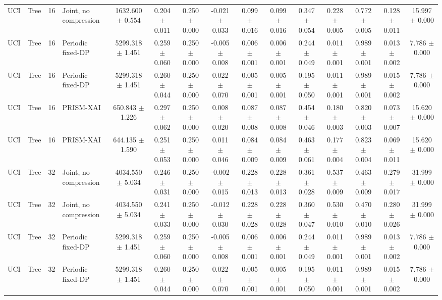 \begin{table}[t]
\begin{tabular}{llllccccccccccc}
UCI & Tree & 16 & Joint, no compression & 1632.600 $\pm$ 0.554 & 0.204 $\pm$ 0.011 & 0.250 $\pm$ 0.000 & -0.021 $\pm$ 0.033 & 0.099 $\pm$ 0.016 & 0.099 $\pm$ 0.016 & 0.347 $\pm$ 0.054 & 0.228 $\pm$ 0.005 & 0.772 $\pm$ 0.005 & 0.128 $\pm$ 0.011 & 15.997 $\pm$ 0.000 \\
UCI & Tree & 16 & Periodic fixed-DP & 5299.318 $\pm$ 1.451 & 0.259 $\pm$ 0.060 & 0.250 $\pm$ 0.000 & -0.005 $\pm$ 0.008 & 0.006 $\pm$ 0.001 & 0.006 $\pm$ 0.001 & 0.244 $\pm$ 0.049 & 0.011 $\pm$ 0.001 & 0.989 $\pm$ 0.001 & 0.013 $\pm$ 0.002 & 7.786 $\pm$ 0.000 \\
UCI & Tree & 16 & Periodic fixed-DP & 5299.318 $\pm$ 1.451 & 0.260 $\pm$ 0.044 & 0.250 $\pm$ 0.000 & 0.022 $\pm$ 0.070 & 0.005 $\pm$ 0.001 & 0.005 $\pm$ 0.001 & 0.195 $\pm$ 0.050 & 0.011 $\pm$ 0.001 & 0.989 $\pm$ 0.001 & 0.015 $\pm$ 0.002 & 7.786 $\pm$ 0.000 \\
UCI & Tree & 16 & PRISM-XAI & 650.843 $\pm$ 1.226 & 0.297 $\pm$ 0.062 & 0.250 $\pm$ 0.000 & 0.008 $\pm$ 0.020 & 0.087 $\pm$ 0.008 & 0.087 $\pm$ 0.008 & 0.454 $\pm$ 0.046 & 0.180 $\pm$ 0.003 & 0.820 $\pm$ 0.003 & 0.073 $\pm$ 0.007 & 15.620 $\pm$ 0.000 \\
UCI & Tree & 16 & PRISM-XAI & 644.135 $\pm$ 1.590 & 0.251 $\pm$ 0.053 & 0.250 $\pm$ 0.000 & 0.011 $\pm$ 0.046 & 0.084 $\pm$ 0.009 & 0.084 $\pm$ 0.009 & 0.463 $\pm$ 0.061 & 0.177 $\pm$ 0.004 & 0.823 $\pm$ 0.004 & 0.069 $\pm$ 0.011 & 15.620 $\pm$ 0.000 \\
UCI & Tree & 32 & Joint, no compression & 4034.550 $\pm$ 5.034 & 0.246 $\pm$ 0.031 & 0.250 $\pm$ 0.000 & -0.002 $\pm$ 0.015 & 0.228 $\pm$ 0.013 & 0.228 $\pm$ 0.013 & 0.361 $\pm$ 0.028 & 0.537 $\pm$ 0.009 & 0.463 $\pm$ 0.009 & 0.279 $\pm$ 0.017 & 31.999 $\pm$ 0.000 \\
UCI & Tree & 32 & Joint, no compression & 4034.550 $\pm$ 5.034 & 0.241 $\pm$ 0.033 & 0.250 $\pm$ 0.000 & -0.012 $\pm$ 0.030 & 0.228 $\pm$ 0.028 & 0.228 $\pm$ 0.028 & 0.360 $\pm$ 0.047 & 0.530 $\pm$ 0.010 & 0.470 $\pm$ 0.010 & 0.280 $\pm$ 0.026 & 31.999 $\pm$ 0.000 \\
UCI & Tree & 32 & Periodic fixed-DP & 5299.318 $\pm$ 1.451 & 0.259 $\pm$ 0.060 & 0.250 $\pm$ 0.000 & -0.005 $\pm$ 0.008 & 0.006 $\pm$ 0.001 & 0.006 $\pm$ 0.001 & 0.244 $\pm$ 0.049 & 0.011 $\pm$ 0.001 & 0.989 $\pm$ 0.001 & 0.013 $\pm$ 0.002 & 7.786 $\pm$ 0.000 \\
UCI & Tree & 32 & Periodic fixed-DP & 5299.318 $\pm$ 1.451 & 0.260 $\pm$ 0.044 & 0.250 $\pm$ 0.000 & 0.022 $\pm$ 0.070 & 0.005 $\pm$ 0.001 & 0.005 $\pm$ 0.001 & 0.195 $\pm$ 0.050 & 0.011 $\pm$ 0.001 & 0.989 $\pm$ 0.001 & 0.015 $\pm$ 0.002 & 7.786 $\pm$ 0.000 \\

\end{tabular}
\end{table}

